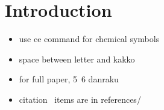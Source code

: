 \section{Introduction}\label{sec:intro}

\lipsum[1-10]

\begin{itemize}
 \item use ce command for chemical symbols
 \item space between letter and kakko
 \item for full paper, 5~6 danraku
 \item citation~\cite{abrahams1971Rutile} items are in references/
\end{itemize}




